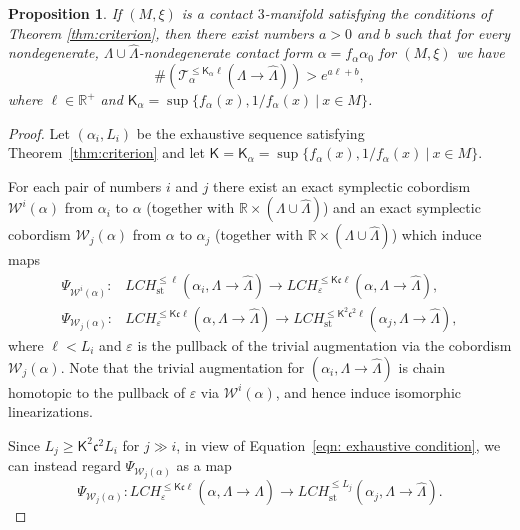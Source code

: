 \documentclass[JEP,XML,SOM,Unicode,NoFloatCountersInSection]{cedram}
\let\mathcal\mathscr
\let\epsilon\varepsilon
\let\ra\rightarrow
\newcommand{\st}{\mathrm{st}}
\theoremstyle{plain}
\newtheorem{prop}[thm]{Proposition}
\theoremstyle{definition}
\numberwithin{equation}{subsection}
\newcommand{\RR}{\mathbb{R}}
\begin{document}
\begin{prop} \label{growth}
If $(M,\xi)$ is a contact $3$-manifold satisfying the conditions of Theorem \ref{thm:criterion}, then there exist numbers $a>0$ and $b$
such that for every nondegenerate, $\Lambda\cup \widehat\Lambda$-nondegenerate contact form $\alpha=f_\alpha\alpha_0$ for $(M,\xi)$ we have
\begin{equation} \label{eqn: growth}
\#(\mathcal{T}^{\leq \mathsf{K}_\alpha \ell }_\alpha(\Lambda\ra \widehat{\Lambda})) > e^{a\ell + b},
\end{equation}
where $\ell\in \RR^+$ and $\mathsf{K}_\alpha=\sup\{ f_\alpha(x), {1/f_\alpha(x)}~|~ x\in M\}$.
\end{prop}

\begin{proof}
Let $(\alpha_i,L_i)$ be the exhaustive sequence satisfying Theorem~\ref{thm:criterion} and let $\mathsf{K}=\mathsf{K}_\alpha=\sup\{ f_\alpha(x), {1/f_\alpha(x)}~|~ x\in M\}$.

For each pair of numbers $i$ and $j$ there exist an exact symplectic cobordism $\mathcal{W}^i(\alpha)$ from $\alpha_i $ to $\alpha$ (together with $\RR\times (\Lambda\cup \widehat\Lambda)$) and an exact symplectic cobordism $\mathcal{W}_j(\alpha)$ from $\alpha$ to $\alpha_j$ (together with $\RR\times (\Lambda\cup \widehat\Lambda)$) which induce maps
\begin{align}
\Psi_{\mathcal{W}^i(\alpha)}:& LCH^{\leq \ell}_{\st}(\alpha_i, \Lambda\ra \widehat\Lambda)\to LCH^{\leq \mathsf{K} {\mathfrak c} \ell }_\epsilon (\alpha, \Lambda\ra\widehat\Lambda),\\
\Psi_{\mathcal{W}_j(\alpha)}:& LCH^{\leq \mathsf{K} {\mathfrak c} \ell}_\epsilon(\alpha,\Lambda\ra\widehat\Lambda)\to LCH^{\leq \mathsf{K}^2{\mathfrak c}^2 \ell}_{\st} (\alpha_j,\Lambda\ra\widehat\Lambda),
\end{align}
where $\ell< L_i$ and $\epsilon$ is the pullback of the trivial augmentation via the cobordism $\mathcal{W}_j(\alpha)$. Note that the trivial augmentation for $(\alpha_i, \Lambda\ra\widehat\Lambda)$ is chain homotopic to the pullback of $\epsilon$ via $\mathcal{W}^i(\alpha)$, and hence induce isomorphic linearizations.

Since $L_j\geq \mathsf{K}^2 {\mathfrak c}^2 L_i$ for $j\gg i$, in view of Equation~\eqref{eqn: exhaustive condition}, we can instead regard $\Psi_{\mathcal{W}_j(\alpha)}$ as a map
$$\Psi_{\mathcal{W}_j(\alpha)}: LCH^{\leq \mathsf{K} {\mathfrak c} \ell}_\epsilon(\alpha,\Lambda\ra\widehat\Lambda)\to LCH^{\leq L_j}_{\st} (\alpha_j,\Lambda\ra\widehat\Lambda).$$


\end{proof}
\end{document}

